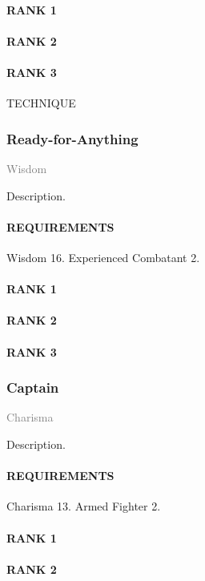 \paragraph{RANK 1}
\paragraph{RANK 2}
\paragraph{RANK 3} TECHNIQUE

\subsubsection{Ready-for-Anything} \label{feat::readyforanything} %
\small{\textcolor{gray}{Wisdom}}

\normalsize
Description.
\paragraph{REQUIREMENTS} Wisdom 16. Experienced Combatant 2.
\paragraph{RANK 1}
\paragraph{RANK 2}
\paragraph{RANK 3}

\subsubsection{Captain} \label{feat::captain}
\small{\textcolor{gray}{Charisma}}

\normalsize
Description.
\paragraph{REQUIREMENTS} Charisma 13. Armed Fighter 2.
\paragraph{RANK 1}
\paragraph{RANK 2}
